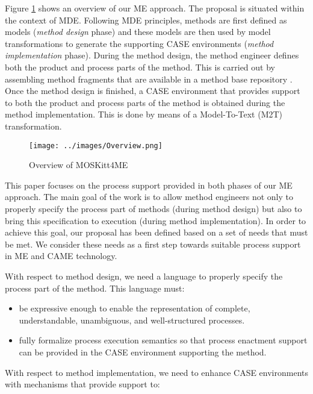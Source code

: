 \documentclass[runningheads,a4paper]{llncs}
\begin{document}
Figure \ref{FigureOverview} shows an overview of our ME approach. The proposal
is situated within the context of MDE. Following MDE principles, methods are
first defined as models (\textit{method design} phase) and these models are then
used by model transformations to generate the supporting CASE environments
(\textit{method implementation} phase). During the method design, the method
engineer defines both the product and process parts of the method. This is
carried out by assembling method fragments that are available in a method base
repository \cite{Cervera11}. Once the method design is finished, a CASE
environment that provides support to both the product and process parts of the
method is obtained during the method implementation. This is done by means of a
Model-To-Text (M2T) transformation.

\begin{figure}
\centering
\texttt{[image: ../images/Overview.png]}
\caption{Overview of MOSKitt4ME}
\label{FigureOverview}
\end{figure}

This paper focuses on the process support provided in both phases of our ME
approach. The main goal of the work is to allow method engineers not only to
properly specify the process part of methods (during method design) but also to
bring this specification to execution (during method implementation). In order
to achieve this goal, our proposal has been defined based on a set of needs that
must be met. We consider these needs as a first step towards suitable process
support in ME and CAME technology.

With respect to method design, we need a language to properly specify the
process part of the method. This language must:

\begin{itemize}
  \item be expressive enough to enable the representation of
  complete, understandable, unambiguous, and well-structured processes. 
  
  \item fully formalize process execution semantics so that process
  enactment support can be provided in the CASE environment supporting the
  method.
\end{itemize}

With respect to method implementation, we need to enhance CASE environments
with mechanisms that provide support to:
\end{document}
